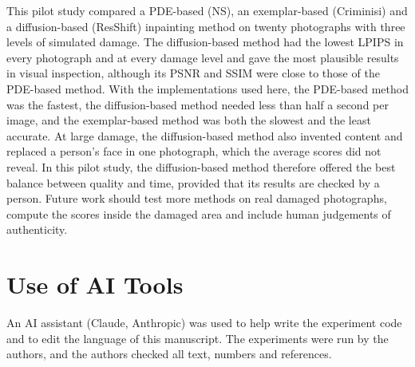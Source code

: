 \documentclass[conference]{IEEEtran}
\begin{document}
This pilot study compared a PDE-based (NS), an exemplar-based (Criminisi) and a diffusion-based (ResShift) inpainting method on twenty photographs with three levels of simulated damage. The diffusion-based method had the lowest LPIPS in every photograph and at every damage level and gave the most plausible results in visual inspection, although its PSNR and SSIM were close to those of the PDE-based method. With the implementations used here, the PDE-based method was the fastest, the diffusion-based method needed less than half a second per image, and the exemplar-based method was both the slowest and the least accurate. At large damage, the diffusion-based method also invented content and replaced a person's face in one photograph, which the average scores did not reveal. In this pilot study, the diffusion-based method therefore offered the best balance between quality and time, provided that its results are checked by a person. Future work should test more methods on real damaged photographs, compute the scores inside the damaged area and include human judgements of authenticity.

\section*{Use of AI Tools}

An AI assistant (Claude, Anthropic) was used to help write the experiment code and to edit the language of this manuscript. The experiments were run by the authors, and the authors checked all text, numbers and references.



\end{document}
